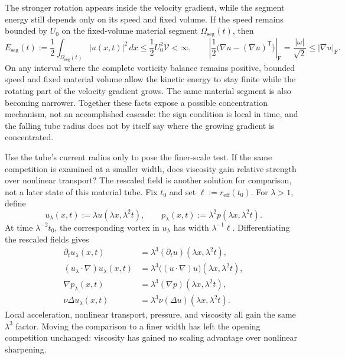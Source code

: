 The stronger rotation appears inside the velocity gradient, while the segment energy still depends only on its speed and fixed volume.
If the speed remains bounded by \(U_0\) on the fixed-volume material segment \(\Omega_{\mathrm{seg}}(t)\), then
\[
  E_{\mathrm{seg}}(t)
  :=
  \frac12\int_{\Omega_{\mathrm{seg}}(t)}|u(x,t)|^2\,dx
  \leq
  \frac12U_0^2\mathcal V
  <
  \infty,
  \qquad
  \left|\frac12\bigl(\nabla u-(\nabla u)^{\mathsf T}\bigr)\right|_{\mathrm F}
  =
  \frac{|\omega|}{\sqrt2}
  \leq
  |\nabla u|_{\mathrm F}.
\]
On any interval where the complete vorticity balance remains positive, bounded speed and fixed material volume allow the kinetic energy to stay finite while the rotating part of the velocity gradient grows.
The same material segment is also becoming narrower.
Together these facts expose a possible concentration mechanism, not an accomplished cascade: the sign condition is local in time, and the falling tube radius does not by itself say where the growing gradient is concentrated.


Use the tube's current radius only to pose the finer-scale test.
If the same competition is examined at a smaller width, does viscosity gain relative strength over nonlinear transport?
The rescaled field is another solution for comparison, not a later state of this material tube.
Fix \(t_0\) and set \(\ell:=r_{\mathrm{eff}}(t_0)\).
For \(\lambda>1\), define
\[
  u_\lambda(x,t)
  :=
  \lambda u(\lambda x,\lambda^2t),
  \qquad
  p_\lambda(x,t)
  :=
  \lambda^2p(\lambda x,\lambda^2t).
\]
At time \(\lambda^{-2}t_0\), the corresponding vortex in \(u_\lambda\) has width \(\lambda^{-1}\ell\).
Differentiating the rescaled fields gives
\[
\begin{aligned}
  \partial_tu_\lambda(x,t)
  &=
  \lambda^3(\partial_tu)(\lambda x,\lambda^2t),
  \\
  (u_\lambda\cdot\nabla)u_\lambda(x,t)
  &=
  \lambda^3\bigl((u\cdot\nabla)u\bigr)(\lambda x,\lambda^2t),
  \\
  \nabla p_\lambda(x,t)
  &=
  \lambda^3(\nabla p)(\lambda x,\lambda^2t),
  \\
  \nu\Delta u_\lambda(x,t)
  &=
  \lambda^3\nu(\Delta u)(\lambda x,\lambda^2t).
\end{aligned}
\]
Local acceleration, nonlinear transport, pressure, and viscosity all gain the same \(\lambda^3\) factor.
Moving the comparison to a finer width has left the opening competition unchanged: viscosity has gained no scaling advantage over nonlinear sharpening.

